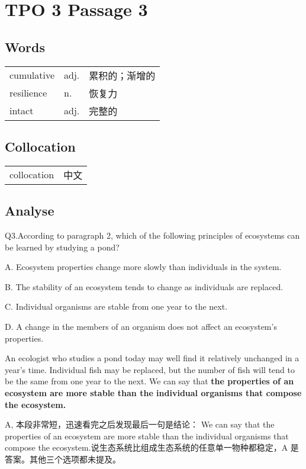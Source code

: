 \section{TPO 3 Passage 3}

\subsection{Words}

\begin{tabular}{lll}
    cumulative & adj. & 累积的；渐增的 \\
    resilience & n.   & 恢复力     \\
    intact     & adj. & 完整的     \\
\end{tabular}

\subsection{Collocation}

\begin{tabular}{ll}
    collocation & 中文 \\
\end{tabular}

\subsection{Analyse}

\begin{blk}
    \begin{qst}
        Q3.According to paragraph 2, which of the following principles of ecosystems can be learned by studying a pond?
    \end{qst}

    \begin{chc}
        A. Ecosystem properties change more slowly than individuals in the system.

        B. The stability of an ecosystem tends to change as individuals are replaced.

        C. Individual organisms are stable from one year to the next.

        D. A change in the members of an organism does not affect an ecosystem’s properties.
    \end{chc}

    \begin{psgq}
        An ecologist who studies a pond today may well find it relatively unchanged in a year’s time. Individual fish may be replaced, but the number of fish will tend to be the same from one year to the next. We can say that \textbf{the properties of an ecosystem are more stable than the individual organisms that compose the ecosystem.}
    \end{psgq}

    \begin{nlz}
        A, 本段非常短，迅速看完之后发现最后一句是结论： We can say that the properties of an ecosystem are more stable than the individual organisms that compose the ecosystem.说生态系统比组成生态系统的任意单一物种都稳定，A 是答案。其他三个选项都未提及。
    \end{nlz}
\end{blk}
